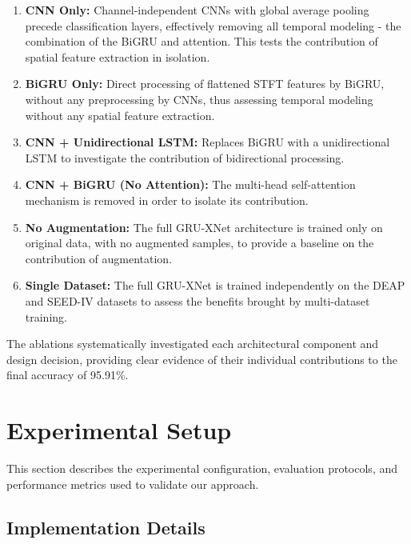 \documentclass[conference]{IEEEtran}
\begin{document}
\begin{enumerate}
    \item \textbf{CNN Only:} Channel-independent CNNs with global average pooling precede classification layers, effectively removing all temporal modeling - the combination of the BiGRU and attention. This tests the contribution of spatial feature extraction in isolation.
    
    \item \textbf{BiGRU Only:} Direct processing of flattened STFT features by BiGRU, without any preprocessing by CNNs, thus assessing temporal modeling without any spatial feature extraction.
    
    \item \textbf{CNN + Unidirectional LSTM:} Replaces BiGRU with a unidirectional LSTM to investigate the contribution of bidirectional processing.
    
    \item \textbf{CNN + BiGRU (No Attention):} The multi-head self-attention mechanism is removed in order to isolate its contribution.
    
    \item \textbf{No Augmentation:} The full GRU-XNet architecture is trained only on original data, with no augmented samples, to provide a baseline on the contribution of augmentation.

    \item \textbf{Single Dataset:} The full GRU-XNet is trained independently on the DEAP and SEED-IV datasets to assess the benefits brought by multi-dataset training.
\end{enumerate}

The ablations systematically investigated each architectural component and design decision, providing clear evidence of their individual contributions to the final accuracy of 95.91\%.

\section{Experimental Setup}
\label{sec:experiments}

This section describes the experimental configuration, evaluation protocols, and performance metrics used to validate our approach.

\subsection{Implementation Details}
\end{document}
